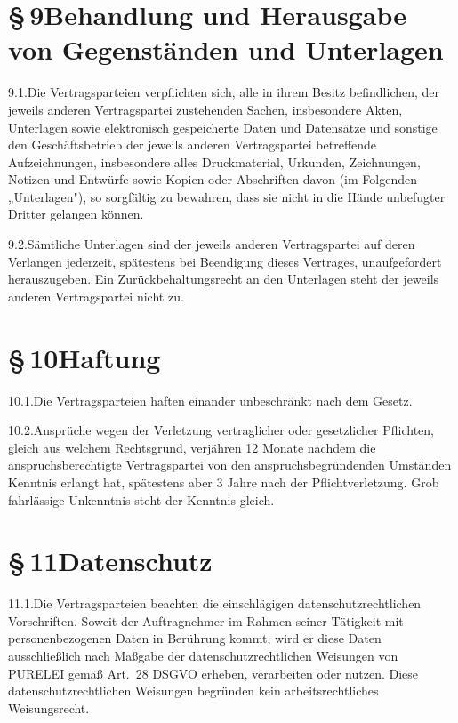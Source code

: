 \documentclass[11pt,a4paper]{article}
\newcommand{\ClientKurzname}{PURELEI}
\begin{document}
\section{§\,9\quad Behandlung und Herausgabe von Gegenständen und Unterlagen}

9.1.\quad Die Vertragsparteien verpflichten sich, alle in ihrem Besitz befindlichen, der jeweils anderen Vertragspartei zustehenden Sachen, insbesondere Akten, Unterlagen sowie elektronisch gespeicherte Daten und Datensätze und sonstige den Geschäftsbetrieb der jeweils anderen Vertragspartei betreffende Aufzeichnungen, insbesondere alles Druckmaterial, Urkunden, Zeichnungen, Notizen und Entwürfe sowie Kopien oder Abschriften davon (im Folgenden „Unterlagen"), so sorgfältig zu bewahren, dass sie nicht in die Hände unbefugter Dritter gelangen können.

9.2.\quad Sämtliche Unterlagen sind der jeweils anderen Vertragspartei auf deren Verlangen jederzeit, spätestens bei Beendigung dieses Vertrages, unaufgefordert herauszugeben. Ein Zurückbehaltungsrecht an den Unterlagen steht der jeweils anderen Vertragspartei nicht zu.

\section{§\,10\quad Haftung}

10.1.\quad Die Vertragsparteien haften einander unbeschränkt nach dem Gesetz.

10.2.\quad Ansprüche wegen der Verletzung vertraglicher oder gesetzlicher Pflichten, gleich aus welchem Rechtsgrund, verjähren 12 Monate nachdem die anspruchsberechtigte Vertragspartei von den anspruchsbegründenden Umständen Kenntnis erlangt hat, spätestens aber 3 Jahre nach der Pflichtverletzung. Grob fahrlässige Unkenntnis steht der Kenntnis gleich.

\section{§\,11\quad Datenschutz}

11.1.\quad Die Vertragsparteien beachten die einschlägigen datenschutzrechtlichen Vorschriften. Soweit der Auftragnehmer im Rahmen seiner Tätigkeit mit personenbezogenen Daten in Berührung kommt, wird er diese Daten ausschließlich nach Maßgabe der datenschutzrechtlichen Weisungen von \ClientKurzname{} gemäß Art.\ 28 DSGVO erheben, verarbeiten oder nutzen. Diese datenschutzrechtlichen Weisungen begründen kein arbeitsrechtliches Weisungsrecht.
\end{document}

